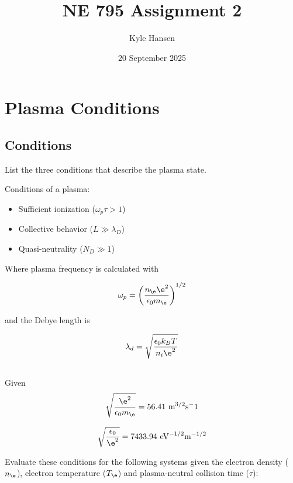 \documentclass{template}
\title{NE 795 Assignment 2}
\author{Kyle Hansen}
\date{20 September 2025}
\begin{document}
\maketitle

\section{Plasma Conditions}

\subsection{Conditions}

List the three conditions that describe the plasma state.

Conditions of a plasma:

\begin{itemize}
    \item Sufficient ionization ($\omega_p \tau > 1$)
    \item Collective behavior ($L \gg \lambda_D$)
    \item Quasi-neutrality ($N_D \gg 1$)
\end{itemize}

Where plasma frequency is calculated with

\begin{equation}
    \omega_p = \left(\frac{n_\e \e^2}{\epsilon_0 m_\e} \right)^{1/2}
\end{equation}

and the Debye length is

\begin{equation}
    \lambda_d = \sqrt{\frac{\epsilon_0 k_B T}{n_i \e^2}}
\end{equation}




\subsection{}

Given
\[
\sqrt{\frac{\e^2}{\epsilon_0 m_\e}} = 56.41 \text{ m}^{3/2}\text{s}^-1
\]

\[
\sqrt{\frac{\epsilon_0}{\e^2}} = 7433.94\text{ eV}^{-1/2}\text{m}^{-1/2}
\]

Evaluate these conditions for the following systems given the electron density ($n_\e$),
electron temperature ($T_\e$) and plasma-neutral collision time ($\tau$):
\end{document}

